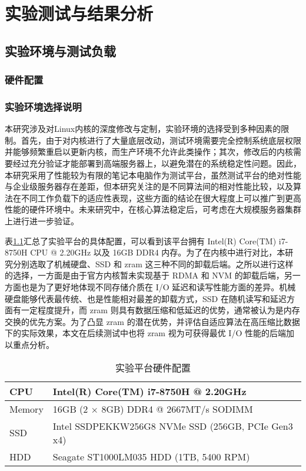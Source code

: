 
\chapter{实验测试与结果分析}

\section{实验环境与测试负载}

\subsection{硬件配置}

\subsection{实验环境选择说明}

本研究涉及对Linux内核的深度修改与定制，实验环境的选择受到多种因素的限制。首先，由于对内核进行了大量底层改动，测试环境需要完全控制系统底层权限并能够频繁重启以更新内核，而生产环境不允许此类操作；其次，修改后的内核需要经过充分验证才能部署到高端服务器上，以避免潜在的系统稳定性问题。因此，本研究采用了性能较为有限的笔记本电脑作为测试平台，虽然测试平台的绝对性能与企业级服务器存在差距，但本研究关注的是不同算法间的相对性能比较，以及算法在不同工作负载下的适应性表现，这些方面的结论在很大程度上可以推广到更高性能的硬件环境中。未来研究中，在核心算法稳定后，可考虑在大规模服务器集群上进行进一步验证。

表\ref{tab:hardware_config}汇总了实验平台的具体配置，可以看到该平台拥有 Intel(R) Core(TM) i7-8750H CPU @ 2.20GHz 以及 16GB DDR4 内存。为了在内核中进行对比，本研究分别选取了机械硬盘、SSD 和 zram 这三种不同的卸载后端。之所以进行这样的选择，一方面是由于官方内核暂未实现基于 RDMA 和 NVM 的卸载后端，另一方面也是为了更好地体现不同存储介质在 I/O 延迟和读写性能方面的差异。机械硬盘能够代表最传统、也是性能相对最差的卸载方式，SSD 在随机读写和延迟方面有一定程度提升，而 zram 则具有数据压缩和低延迟的优势，通常被认为是内存交换的优先方案。为了凸显 zram 的潜在优势，并评估自适应算法在高压缩比数据下的实际效果，本文在后续测试中也将 zram 视为可获得最优 I/O 性能的后端加以重点分析。

\begin{table}[ht]
    \centering
    \caption{实验平台硬件配置}
    \label{tab:hardware_config}
    \begin{tabular}{ll}
        \toprule
        CPU & Intel(R) Core(TM) i7-8750H @ 2.20GHz \\
        \midrule
        Memory & 16GB (2 \(\times\) 8GB) DDR4 @ 2667MT/s SODIMM \\
        \midrule
        SSD & Intel SSDPEKKW256G8 NVMe SSD (256GB, PCIe Gen3 x4)  \\
        \midrule
        HDD & Seagate ST1000LM035 HDD (1TB, 5400 RPM) \\
        \bottomrule
    \end{tabular}
\end{table}

